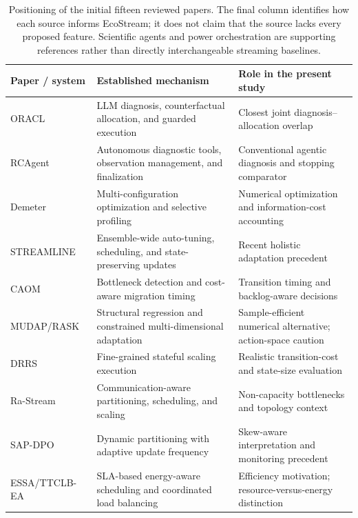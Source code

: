 \begin{table}[t]
\caption{Positioning of the initial fifteen reviewed papers. The final column identifies how each source informs EcoStream; it does not claim that the source lacks every proposed feature. Scientific agents and power orchestration are supporting references rather than directly interchangeable streaming baselines.}
\label{tab:related-work}
\centering
\footnotesize
\setlength{\tabcolsep}{5pt}
\renewcommand{\arraystretch}{1.13}
\begin{tabularx}{\textwidth}{@{}p{} >{\raggedright\arraybackslash}X >{\raggedright\arraybackslash}X@{}}
\toprule
\textbf{Paper / system} & \textbf{Established mechanism} & \textbf{Role in the present study} \\
\midrule
ORACL~\cite{bai2026oracl} & LLM diagnosis, counterfactual allocation, and guarded execution & Closest joint diagnosis--allocation overlap \\
RCAgent~\cite{wang2024rcagent} & Autonomous diagnostic tools, observation management, and finalization & Conventional agentic diagnosis and stopping comparator \\
Demeter~\cite{geldenhuys2024demeter} & Multi-configuration optimization and selective profiling & Numerical optimization and information-cost accounting \\
STREAMLINE~\cite{pedratscher2025streamline} & Ensemble-wide auto-tuning, scheduling, and state-preserving updates & Recent holistic adaptation precedent \\
CAOM~\cite{tan2025caom} & Bottleneck detection and cost-aware migration timing & Transition timing and backlog-aware decisions \\
MUDAP/RASK~\cite{sedlak2026mudap} & Structural regression and constrained multi-dimensional adaptation & Sample-efficient numerical alternative; action-space caution \\
DRRS~\cite{qing2025drrs} & Fine-grained stateful scaling execution & Realistic transition-cost and state-size evaluation \\
Ra-Stream~\cite{fan2026rastream} & Communication-aware partitioning, scheduling, and scaling & Non-capacity bottlenecks and topology context \\
SAP-DPO~\cite{ren2026sapdpo} & Dynamic partitioning with adaptive update frequency & Skew-aware interpretation and monitoring precedent \\
ESSA/TTCLB-EA~\cite{li2025energyflink} & SLA-based energy-aware scheduling and coordinated load balancing & Efficiency motivation; resource-versus-energy distinction \\

\end{tabularx}
\end{table}
